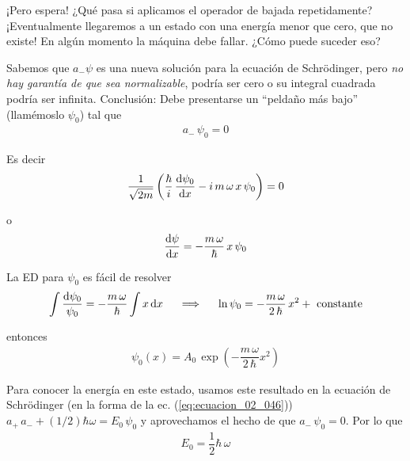 ¡Pero espera! ¿Qué pasa si aplicamos el operador de bajada repetidamente? ¡Eventualmente llegaremos a un estado con una energía menor que cero, que no existe! En algún momento la máquina debe fallar. ¿Cómo puede suceder eso? 
\par
Sabemos que $a_{-} \psi$ es una nueva solución para la ecuación de Schrödinger, pero \emph{no hay garantía de que sea normalizable}, podría ser cero o su integral cuadrada podría ser infinita. Conclusión: Debe presentarse un \enquote{peldaño más bajo} (llamémoslo $\psi_{0}$) tal que
\begin{align}
a_{-} \, \psi_{0} = 0
\label{eq:ecuacion_02_047}
\end{align}

Es decir
\begin{align*}
\dfrac{1}{\sqrt{2 m}} \left( \dfrac{\hbar}{i} \, \dv{\psi_{0}}{x} - i \, m \, \omega \, x \, \psi_{0} \right) = 0
\end{align*}

o
\begin{align*}
\dv{\psi}{x} = -\dfrac{m \, \omega}{\hbar} \, x \, \psi_{0}
\end{align*}

La ED para $\psi_{0}$ es fácil de resolver
\begin{align*}
\int \dfrac{\dd{\psi_{0}}}{\psi_{0}} = - \dfrac{m \, \omega}{\hbar} \int x \dd{x} \hspace{0.5cm} \Longrightarrow \hspace{0.5cm} \ln \psi_{0} = - \dfrac{m \, \omega}{2 \, \hbar} \, x^{2} + \text{ constante}
\end{align*}

entonces
\begin{align}
\psi_{0} (x) = A_{0} \, \exp \left( - \dfrac{m \, \omega}{2 \, \hbar} x^{2} \right)
\label{eq:ecuacion_02_048}
\end{align}

Para conocer la energía en este estado, usamos este resultado en la ecuación de Schrödinger (en la forma de la ec. (\ref{eq:ecuacion_02_046})) $a_{+} \, a_{-} + (1/2) \hbar \omega = E_{0} \, \psi_{0}$ y aprovechamos el hecho de que $a_{-} \, \psi_{0} = 0$. Por lo que
\begin{align}
E_{0} = \dfrac{1}{2} \hbar \, \omega
\label{eq:ecuacion_02_049}
\end{align}

